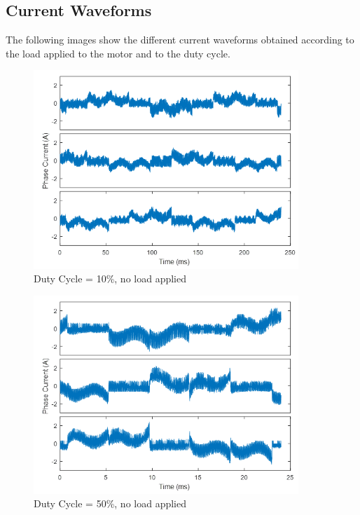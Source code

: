 \clearpage
\subsection{Current Waveforms}

The following images show the different current waveforms obtained according to the load applied to the motor and to the duty cycle.

\begin{figure}[h!p]
\centering
\includegraphics[width=10cm]{Images/waveforms/trap_curr_1.png}
\caption[trapc1]{Duty Cycle = 10\%, no load applied}
\label{fig:trapc1}
\end{figure}

\begin{figure}[h!p]
\centering
\includegraphics[width=10cm]{Images/waveforms/trap_curr_2.png} 
\caption[trapc1]{Duty Cycle = 50\%, no load applied}
\label{fig:trapc2}
\end{figure}

